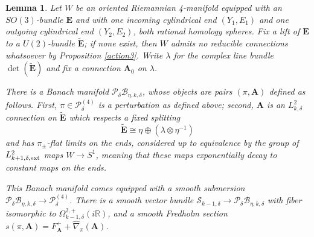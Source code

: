 \documentclass{memo-l}
\newtheorem{lemma}[theorem]{Lemma}
\theoremstyle{definition}
\theoremstyle{remark}
\numberwithin{section}{chapter}
\numberwithin{equation}{chapter}
\begin{document}
\begin{lemma}\label{pi-Banach}Let $W$ be an oriented Riemannian 4-manifold equipped with an $SO(3)$-bundle $\mathbf{E}$ and with one incoming cylindrical end $(Y_1,E_1)$ and one outgoing cylindrical end $(Y_2, E_2)$, both rational homology spheres. Fix a lift of $\mathbf{E}$ to a $U(2)$-bundle $\widetilde{\mathbf{E}}$; if none exist, then $W$ admits no reducible connections whatsoever by Proposition \ref{action3}. Write $\lambda$ for the complex line bundle $\det(\widetilde{\mathbf{E}})$ and fix a connection $\mathbf{A}_0$ on $\lambda$.

There is a Banach manifold $\mathcal P_{\delta} \mathcal B_{\eta, k, \delta}$, whose objects are pairs $(\pi, \mathbf{A})$ defined as follows. First, $\pi \in \mathcal P^{(4)}_\delta$ is a perturbation as defined above; second, $\mathbf{A}$ is an $L^2_{k,\delta}$ connection on $\widetilde{\mathbf{E}}$ which respects a fixed splitting
$$\widetilde{\mathbf{E}} \cong \eta \oplus (\lambda \otimes \eta^{-1})$$
and has $\pi_\pm$-flat limits on the ends, considered up to equivalence by the group of $L^2_{k+1,\delta,\textup{ext}}$ maps $W \to S^1$, meaning that these maps exponentially decay to constant maps on the ends.

This Banach manifold comes equipped with a smooth submersion $\mathcal P_{\delta} \mathcal B_{\eta, k, \delta} \to \mathcal P^{(4)}_{\delta}$. There is a smooth vector bundle $\mathcal S_{k-1,\delta} \to \mathcal P_{\delta} \mathcal B_{\eta, k, \delta}$ with fiber isomorphic to $\Omega^{2,+}_{k-1,\delta}(i\mathbb R)$, and a smooth Fredholm section $s(\pi, \mathbf{A}) = F_{\mathbf{A}}^+ + \widehat{\nabla}_\pi(\mathbf{A})$.
\end{lemma}
\end{document}
